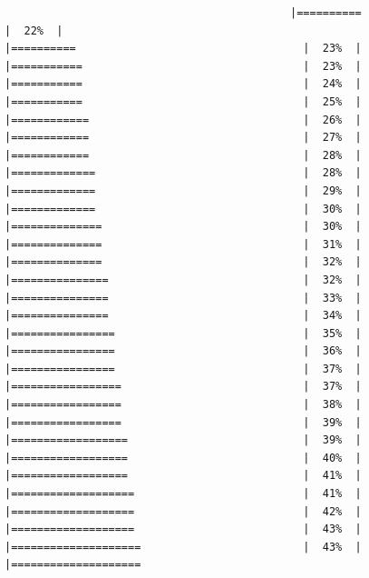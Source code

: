 \documentclass[
  krantz2]{krantz}
\begin{document}
\begin{verbatim}
                                            |==========                                   |  22%  |                                                     |==========                                   |  23%  |                                                     |===========                                  |  23%  |                                                     |===========                                  |  24%  |                                                     |===========                                  |  25%  |                                                     |============                                 |  26%  |                                                     |============                                 |  27%  |                                                     |============                                 |  28%  |                                                     |=============                                |  28%  |                                                     |=============                                |  29%  |                                                     |=============                                |  30%  |                                                     |==============                               |  30%  |                                                     |==============                               |  31%  |                                                     |==============                               |  32%  |                                                     |===============                              |  32%  |                                                     |===============                              |  33%  |                                                     |===============                              |  34%  |                                                     |================                             |  35%  |                                                     |================                             |  36%  |                                                     |================                             |  37%  |                                                     |=================                            |  37%  |                                                     |=================                            |  38%  |                                                     |=================                            |  39%  |                                                     |==================                           |  39%  |                                                     |==================                           |  40%  |                                                     |==================                           |  41%  |                                                     |===================                          |  41%  |                                                     |===================                          |  42%  |                                                     |===================                          |  43%  |                                                     |====================                         |  43%  |                                                     |====================              
\end{verbatim}
\end{document}

